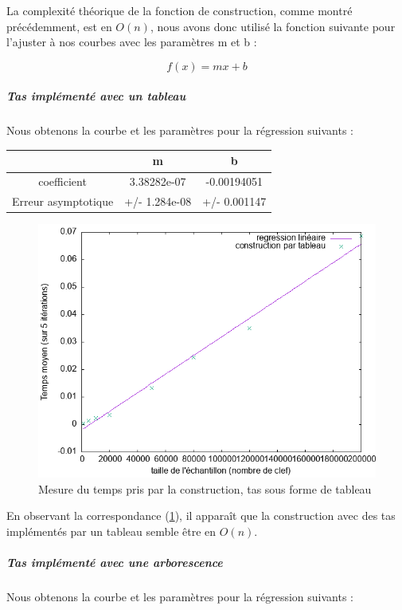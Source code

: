 \documentclass[12pt,a4paper]{article}
\begin{document}
La complexité théorique de la fonction de construction, comme montré précédemment, est en $O(n)$, nous avons donc utilisé la fonction suivante pour l'ajuster à nos courbes avec les paramètres m et b : 

$$
f(x) = mx +b
$$

\subparagraph{Tas implémenté avec un tableau}

Nous obtenons la courbe et les paramètres pour la régression suivants : 

\begin{center}
\begin{tabular}{|c|c|c|}
\hline
 & m & b \\
\hline
coefficient & 3.38282e-07 & -0.00194051 \\
Erreur asymptotique & +/- 1.284e-08 & +/- 0.001147  \\
\hline
\end{tabular}
\end{center}


\begin{figure}[hbtp]
\centering
\includegraphics[scale=0.4]{../Images/svg courbes pour rapport/cplxt_cons_tab_regression.png}
\caption{Mesure du temps pris par la construction, tas sous forme de tableau}
\label{fig3}
\end{figure}

En observant la correspondance (\ref{fig3}), il apparaît que la construction avec des tas implémentés par un tableau semble être en $O(n)$.


\subparagraph{Tas implémenté avec une arborescence}

Nous obtenons la courbe et les paramètres pour la régression suivants : 
\end{document}
